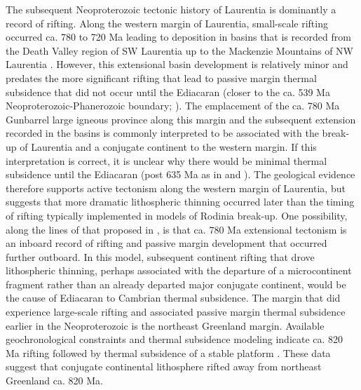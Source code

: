 \documentclass[11pt,letterpaper]{article}
\begin{document}
The subsequent Neoproterozoic tectonic history of Laurentia is dominantly a record of rifting. Along the western margin of Laurentia, small-scale rifting occurred ca. 780 to 720 Ma leading to deposition in basins that is recorded from the Death Valley region of SW Laurentia up to the Mackenzie Mountains of NW Laurentia \citep{Rooney2017a}. However, this extensional basin development is relatively minor and predates the more significant rifting that lead to passive margin thermal subsidence that did not occur until the Ediacaran (closer to the ca. 539 Ma Neoproterozoic-Phanerozoic boundary; \citealp{Bond1984a, Levy1991a}). The emplacement of the ca. 780 Ma Gunbarrel large igneous province along this margin and the subsequent extension recorded in the basins is commonly interpreted to be associated with the break-up of Laurentia and a conjugate continent to the western margin. If this interpretation is correct, it is unclear why there would be minimal thermal subsidence until the Ediacaran (post 635 Ma as in \citealp{Levy1991a} and \citealp{Witkosky2018a}). The geological evidence therefore supports active tectonism along the western margin of Laurentia, but suggests that more dramatic lithospheric thinning occurred later than the timing of rifting typically implemented in models of Rodinia break-up. One possibility, along the lines of that proposed in \citet{Ross1991a}, is that ca. 780 Ma extensional tectonism is an inboard record of rifting and passive margin development that occurred further outboard. In this model, subsequent continent rifting that drove lithospheric thinning, perhaps associated with the departure of a microcontinent fragment rather than an already departed major conjugate continent, would be the cause of Ediacaran to Cambrian thermal subsidence. The margin that did experience large-scale rifting and associated passive margin thermal subsidence earlier in the Neoproterozoic is the northeast Greenland margin. Available geochronological constraints and thermal subsidence modeling indicate ca. 820 Ma rifting followed by thermal subsidence of a stable platform \citep{Maloof2006a, Halverson2018a}. These data suggest that conjugate continental lithosphere rifted away from northeast Greenland ca. 820 Ma. 
\end{document}
